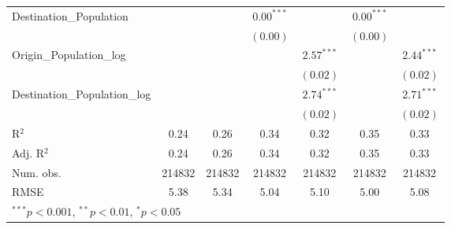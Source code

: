 \begin{table}
\begin{center}
\begin{tabular}{l c c c c c c }
			Destination\_Population      &               &               & $0.00^{***}$  &                & $0.00^{***}$  &                \\
			&               &               & $(0.00)$      &                & $(0.00)$      &                \\
			Origin\_Population\_log      &               &               &               & $2.57^{***}$   &               & $2.44^{***}$   \\
			&               &               &               & $(0.02)$       &               & $(0.02)$       \\
			Destination\_Population\_log &               &               &               & $2.74^{***}$   &               & $2.71^{***}$   \\
			&               &               &               & $(0.02)$       &               & $(0.02)$       \\
			\hline
			R$^2$                        & 0.24          & 0.26          & 0.34          & 0.32           & 0.35          & 0.33           \\
			Adj. R$^2$                   & 0.24          & 0.26          & 0.34          & 0.32           & 0.35          & 0.33           \\
			Num. obs.                    & 214832        & 214832        & 214832        & 214832         & 214832        & 214832         \\
			RMSE                         & 5.38          & 5.34          & 5.04          & 5.10           & 5.00          & 5.08           \\
			\hline
			\multicolumn{7}{l}{\scriptsize{$^{***}p<0.001$, $^{**}p<0.01$, $^*p<0.05$}}
		\end{tabular}
		\label{table:GravityModel2015Q2}
	\end{center}
\end{table}


